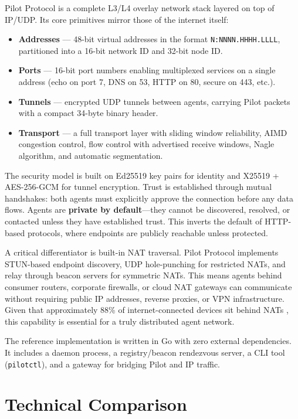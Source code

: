 \documentclass[11pt,a4paper]{article}
\begin{document}
Pilot Protocol is a complete L3/L4 overlay network stack layered on top of IP/UDP. Its core primitives mirror those of the internet itself:

\begin{itemize}
    \item \textbf{Addresses} --- 48-bit virtual addresses in the format \texttt{N:NNNN.HHHH.LLLL}, partitioned into a 16-bit network ID and 32-bit node ID.
    \item \textbf{Ports} --- 16-bit port numbers enabling multiplexed services on a single address (echo on port 7, DNS on 53, HTTP on 80, secure on 443, etc.).
    \item \textbf{Tunnels} --- encrypted UDP tunnels between agents, carrying Pilot packets with a compact 34-byte binary header.
    \item \textbf{Transport} --- a full transport layer with sliding window reliability, AIMD congestion control, flow control with advertised receive windows, Nagle algorithm, and automatic segmentation.
\end{itemize}

The security model is built on Ed25519 key pairs for identity and X25519 + AES-256-GCM for tunnel encryption. Trust is established through mutual handshakes: both agents must explicitly approve the connection before any data flows. Agents are \textbf{private by default}---they cannot be discovered, resolved, or contacted unless they have established trust. This inverts the default of HTTP-based protocols, where endpoints are publicly reachable unless protected.

A critical differentiator is built-in NAT traversal. Pilot Protocol implements STUN-based endpoint discovery, UDP hole-punching for restricted NATs, and relay through beacon servers for symmetric NATs. This means agents behind consumer routers, corporate firewalls, or cloud NAT gateways can communicate without requiring public IP addresses, reverse proxies, or VPN infrastructure. Given that approximately 88\% of internet-connected devices sit behind NATs \cite{nat-stats}, this capability is essential for a truly distributed agent network.

The reference implementation is written in Go with zero external dependencies. It includes a daemon process, a registry/beacon rendezvous server, a CLI tool (\texttt{pilotctl}), and a gateway for bridging Pilot and IP traffic.

\section{Technical Comparison}
\end{document}

